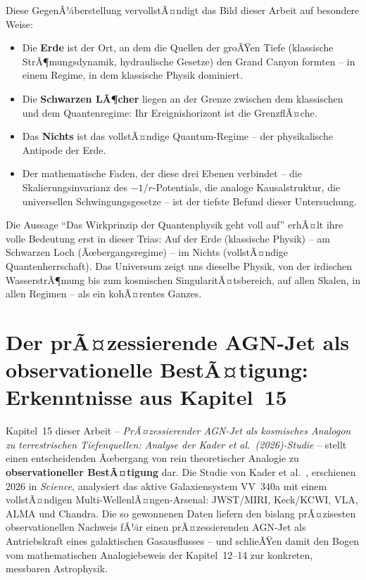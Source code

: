 ﻿\documentclass[12pt,a4paper]{report}
\begin{document}
Diese GegenÃ¼berstellung vervollstÃ¤ndigt das Bild dieser Arbeit auf besondere Weise:
\begin{itemize}
    \item Die \textbf{Erde} ist der Ort, an dem die Quellen der groÃŸen Tiefe (klassische StrÃ¶mungs\-dynamik, hydraulische Gesetze) den Grand Canyon formten -- in einem Regime, in dem klassische Physik dominiert.
    \item Die \textbf{Schwarzen LÃ¶cher} liegen an der Grenze zwischen dem klassischen und dem Quantenregime: Ihr Ereignishorizont ist die GrenzflÃ¤che.
    \item Das \textbf{Nichts} ist das vollstÃ¤ndige Quantum-Regime -- der physikalische Antipode der Erde.
    \item Der mathematische Faden, der diese drei Ebenen verbindet -- die Skalierungsinvarianz des $-1/r$-Potentials, die analoge Kausalstruktur, die universellen Schwingungsgesetze -- ist der tiefste Befund dieser Untersuchung.
\end{itemize}

Die Aussage "`Das Wirkprinzip der Quantenphysik geht voll auf"' erhÃ¤lt ihre volle Bedeutung erst in dieser Trias: Auf der Erde (klassische Physik) -- am Schwarzen Loch (Ãœbergangsregime) -- im Nichts (vollstÃ¤ndige Quantenherrschaft). Das Universum zeigt uns dieselbe Physik, von der irdischen WasserstrÃ¶mung bis zum kosmischen SingularitÃ¤tsbereich, auf allen Skalen, in allen Regimen -- als ein kohÃ¤rentes Ganzes.

\section{Der prÃ¤zessierende AGN-Jet als observationelle BestÃ¤tigung: Erkenntnisse aus Kapitel~15}
\label{sec:zusammenfassung_agn}

Kapitel~15 dieser Arbeit -- \textit{PrÃ¤zessierender AGN-Jet als kosmisches Analogon zu terrestrischen Tiefenquellen: Analyse der Kader et al.\ (2026)-Studie} -- stellt einen entscheidenden Ãœbergang von rein theoretischer Analogie zu \textbf{observationeller BestÃ¤tigung} dar. Die Studie von Kader et al.\ \cite{kader2026}, erschienen 2026 in \textit{Science}, analysiert das aktive Galaxiensystem VV~340a mit einem vollstÃ¤ndigen Multi-WellenlÃ¤ngen-Arsenal: JWST/MIRI, Keck/KCWI, VLA, ALMA und Chandra. Die so gewonnenen Daten liefern den bislang prÃ¤zisesten observationellen Nachweis fÃ¼r einen prÃ¤zessierenden AGN-Jet als Antriebskraft eines galaktischen Gasausflusses -- und schlieÃŸen damit den Bogen vom mathematischen Analogiebeweis der Kapitel~12--14 zur konkreten, messbaren Astrophysik.
\end{document}
